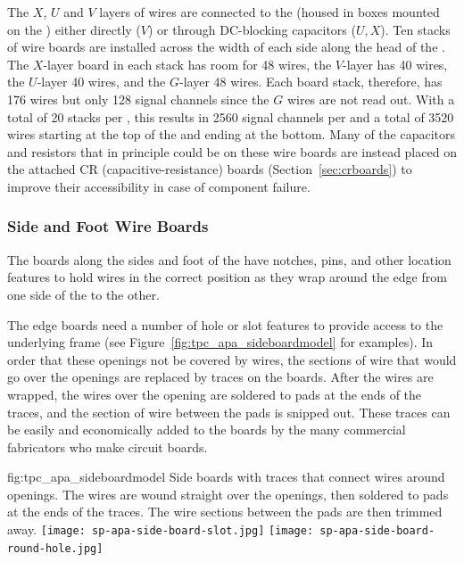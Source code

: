 The $X$, $U$ and $V$ layers of wires are connected to the  (housed in boxes mounted on the ) either directly ($V$) or through DC-blocking capacitors ($U,X$).  Ten stacks of wire boards are installed across the width of each side along the head of the .  The $X$-layer board in each stack has room for \num{48} wires, the $V$-layer has 40 wires, the $U$-layer \num{40} wires, and the $G$-layer \num{48} wires.  Each board stack, therefore, has \num{176} wires but only \num{128} signal channels since the $G$ wires are not read out. With a total of \num{20} stacks per , this results in \num{2560} signal channels per  and a total of \num{3520} wires starting at the top of the  and ending at the bottom. Many of the capacitors and resistors that in principle could be on these wire boards are instead placed on the attached CR (capacitive-resistance) boards (Section~\ref{sec:crboards}) to improve their accessibility in case of component failure. 

\subsubsection{Side and Foot Wire Boards}

The boards along the sides and foot of the  have notches, pins, and other location features to hold wires in the correct position as they wrap around the edge from one side of the  to the other.  

The edge boards need a number of hole or slot features to provide access to the underlying frame (see Figure~\ref{fig:tpc_apa_sideboardmodel} for examples).  In order that these openings not be covered by wires, the sections of wire that would go over the openings are replaced by traces on the boards.  After the wires are wrapped, the wires over the opening are soldered to pads at the ends of the traces, and the section of wire between the pads is snipped out.  These traces can be easily and economically added to the boards by the many commercial fabricators who make circuit boards. 

\begin{dunefigure}{fig:tpc_apa_sideboardmodel}
{Side boards with traces that connect wires around openings.  The wires are wound straight over the openings, then soldered to pads at the ends of the traces. The wire sections between the pads are then trimmed away.}
\texttt{[image: sp-apa-side-board-slot.jpg]} \quad
\texttt{[image: sp-apa-side-board-round-hole.jpg]}
\end{dunefigure}

